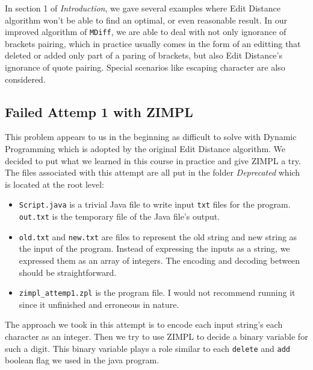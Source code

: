 \documentclass{article}
\begin{document}
In section 1 of \textit{Introduction}, we gave several examples where Edit Distance algorithm won't be able to find an optimal, or even reasonable result. In our improved algorithm of \texttt{MDiff}, we are able to deal with not only ignorance of brackets pairing, which in practice usually comes in the form of an editting that deleted or added only part of a paring of brackets, but also Edit Distance's ignorance of quote pairing. Special scenarios like escaping character are also considered.

\subsection{Failed Attemp 1 with ZIMPL}
This problem appears to us in the beginning as difficult to solve with Dynamic Programming which is adopted by the original Edit Distance algorithm. We decided to put what we learned in this course in practice and give ZIMPL a try. \\

The files associated with this attempt are all put in the folder \textit{Deprecated} which is located at the root level:
\begin{itemize}
  \item \texttt{Script.java} is a trivial Java file to write input \texttt{txt} files for the program. \texttt{out.txt} is the temporary file of the Java file's output.
  \item \texttt{old.txt} and \texttt{new.txt} are files to represent the old string and new string as the input of the program. Instead of expressing the inputs as a string, we expressed them as an array of integers. The encoding and decoding between should be straightforward.
  \item \texttt{zimpl\_attemp1.zpl} is the program file. I would not recommend running it since it unfinished and erroneous in nature. 
\end{itemize}

The approach we took in this attempt is to encode each input string's each character as an integer. Then we try to use ZIMPL to decide a binary variable for such a digit. This binary variable plays a role similar to each \texttt{delete} and \texttt{add} boolean flag we used in the java program. \\
\end{document}
